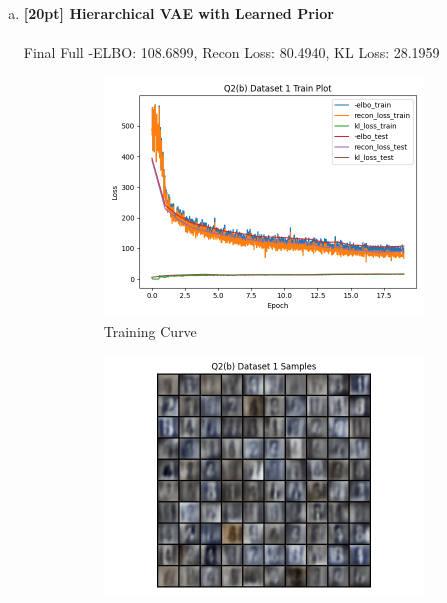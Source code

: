 \documentclass{article}
\begin{document}
\begin{enumerate}[(a)]
        \newpage

        \item {\bf [20pt] Hierarchical VAE with Learned Prior} \\\\
        Final Full -ELBO: 108.6899, Recon Loss: 80.4940, KL Loss: 28.1959
        \begin{figure}[H]
               \centering
               \begin{subfigure}[b]{0.475\textwidth}
                   \centering
                   \includegraphics[width=\textwidth]{figures/q2_b_dset1_train_plot.png}
                   \caption{Training Curve}
               \end{subfigure}
               \hfill
               \begin{subfigure}[b]{0.475\textwidth}
                   \centering
                   \includegraphics[width=\textwidth]{figures/q2_b_dset1_samples.png}

\end{subfigure}
\end{figure}
\end{enumerate}
\end{document}
